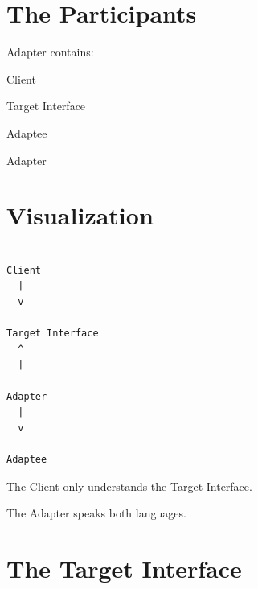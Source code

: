 \documentclass[11pt,a4paper]{book}
\begin{document}

\section{The Participants}

Adapter contains:


Client


Target Interface


Adaptee


Adapter


\section{Visualization}

\begin{verbatim}

Client
  |
  v

Target Interface
  ^
  |

Adapter
  |
  v

Adaptee

\end{verbatim}


The Client only understands
the Target Interface.


The Adapter speaks both
languages.


\section{The Target Interface}
\end{document}
